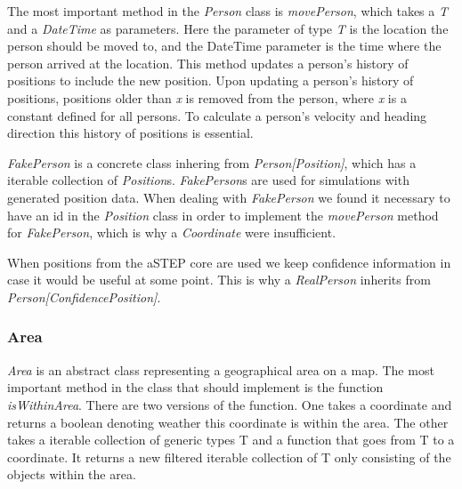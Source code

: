 The most important method in the \emph{Person} class is \emph{movePerson}, which takes a \emph{T} and a \emph{DateTime} as parameters. Here the parameter of type \emph{T} is the location the person should be moved to, and the DateTime parameter is the time where the person arrived at the location. This method updates a person's history of positions to include the new position. Upon updating a person's history of positions, positions older than \emph{x} is removed from the person, where \emph{x} is a constant defined for all persons. To calculate a person's velocity and heading direction this history of positions is essential.

\emph{FakePerson} is a concrete class inhering from \emph{Person[Position]}, which has a iterable collection of \emph{Position}s. \emph{FakePerson}s are used for simulations with generated position data. When dealing with \emph{FakePerson} we found it necessary to have an id in the \emph{Position} class in order to implement the \emph{movePerson} method for \emph{FakePerson}, which is why a \emph{Coordinate} were insufficient. 

When positions from the aSTEP core are used we keep confidence information in case it would be useful at some point. This is why a \emph{RealPerson} inherits from \emph{Person[ConfidencePosition]}.

\subsubsection{Area}
\emph{Area} is an abstract class representing a geographical area on a map. The most important method in the class that should implement is the function \emph{isWithinArea}. There are two versions of the function. One takes a coordinate and returns a boolean denoting weather this coordinate is within the area. The other takes a iterable collection of generic types T and a function that goes from T to a coordinate. It returns a new filtered iterable collection of T only consisting of the objects within the area.


